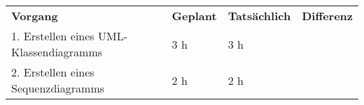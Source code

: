 \begin{tabularx}{\textwidth}{Xlll}
\rowcolor{heading}\textbf{Vorgang} & \textbf{Geplant} & \textbf{Tatsächlich} & \textbf{Differenz} \\
1. Erstellen eines UML-Klassendiagramms & 3 h   & 3 h   &  \\
\rowcolor{odd}2. Erstellen eines Sequenzdiagramms & 2 h   & 2 h   &  \\
\end{tabularx}
